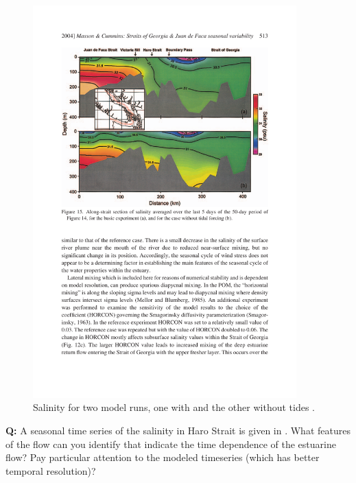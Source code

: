 \begin{figure}[htb]
  \centering
  \includegraphics[width=4in]{figs/MassonCummins04Fig15}
  \caption{Salinity for two model runs, one with and the other without
    tides \citep{massoncummins04}. }
  \label{fig:MassonCummins04Fig15}
\end{figure}

\textbf{Q:} A seasonal time series of the salinity in Haro Strait is given in .  What features of the flow can you identify that indicate the time dependence of the estuarine flow?  Pay particular attention to the modeled timeseries (which has better temporal resolution)?

